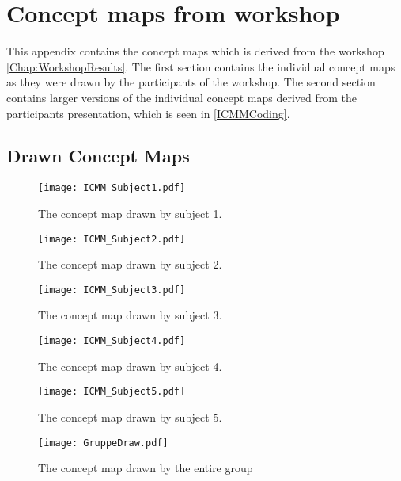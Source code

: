 \chapter{Concept maps from workshop}
\label{App:WorkshopConceptMaps}
This appendix contains the concept maps which is derived from the workshop \autoref{Chap:WorkshopResults}. The first section contains the individual concept maps as they were drawn by the participants of the workshop. The second section contains larger versions of the individual concept maps derived from the participants presentation, which is seen in \autoref{ICMMCoding}.

\section{Drawn Concept Maps}
\label{DrawnConceptMaps}
%
\begin{figure}[H]
	\centering
	\texttt{[image: ICMM\_Subject1.pdf]}
	\caption{The concept map drawn by subject 1.}
	\label{fig:DrawnICMM1}
\end{figure}
%
\begin{figure}[H]
	\centering
	\texttt{[image: ICMM\_Subject2.pdf]}
	\caption{The concept map drawn by subject 2.}
	\label{fig:DrawnICMM2}
\end{figure}
%
\begin{figure}[H]
	\centering
	\texttt{[image: ICMM\_Subject3.pdf]}
	\caption{The concept map drawn by subject 3.}
	\label{fig:DrawnICMM3}
\end{figure}
%
\begin{figure}[H]
	\centering
	\texttt{[image: ICMM\_Subject4.pdf]}
	\caption{The concept map drawn by subject 4.}
	\label{fig:DrawnICMM4}
\end{figure}
%
\begin{figure}[H]
	\centering
	\texttt{[image: ICMM\_Subject5.pdf]}
	\caption{The concept map drawn by subject 5.}
	\label{fig:DrawnICMM5}
\end{figure}
%
\begin{figure}[H]
	\centering
	\texttt{[image: GruppeDraw.pdf]}
	\caption{The concept map drawn by the entire group}
	\label{fig:GroupDraw}
\end{figure}

